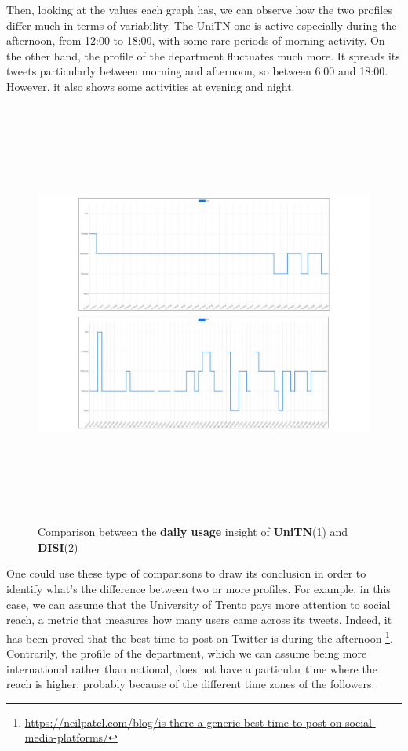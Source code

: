Then, looking at the values each graph has, we can observe how the two profiles differ much in terms of variability. 
The UniTN one is active especially during the afternoon, from 12:00 to 18:00, with some rare periods of morning activity.
On the other hand, the profile of the department fluctuates much more. It spreads its tweets particularly between morning and afternoon, so between 6:00 and 18:00. However, it also shows some activities at evening and night.

\begin{figure}
    \centering
    \includegraphics[width=%
    1.0\textwidth,height=14cm,keepaspectratio]{img/dailycomparison.pdf}
    \caption{Comparison between the \textbf{daily usage} insight of \textbf{UniTN}(1) and \textbf{DISI}(2)}
    \label{fig:dailyComp}
\end{figure}

One could use these type of comparisons to draw its conclusion in order to identify what's the difference between two or more profiles.
For example, in this case, we can assume that the University of Trento pays more attention to social reach, a metric that measures how many users came across its tweets. Indeed, it has been proved that the best time to post on Twitter is during the afternoon \footnote{\url{https://neilpatel.com/blog/is-there-a-generic-best-time-to-post-on-social-media-platforms/}}.
Contrarily, the profile of the department, which we can assume being more international rather than  national, does not have a particular time where the reach is higher; probably because of the different time zones of the followers.

